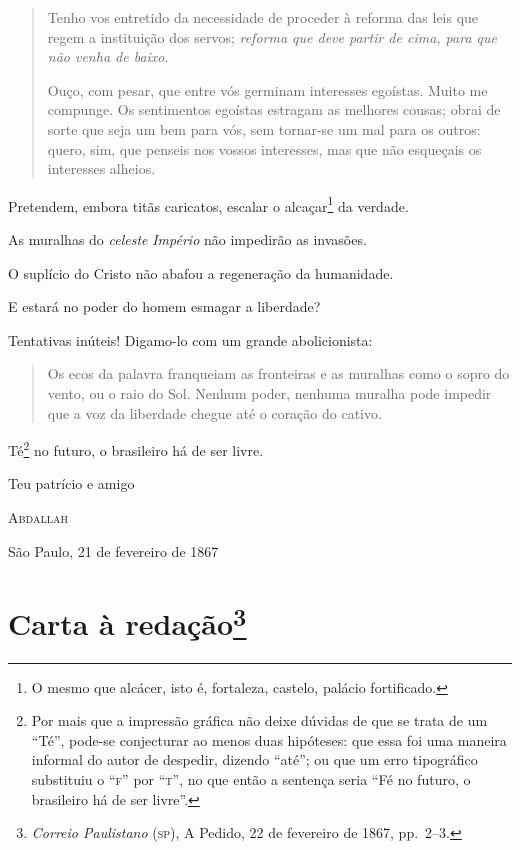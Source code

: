 \begin{quote}
Tenho vos entretido da necessidade de proceder à reforma das leis que
regem a instituição dos servos; \emph{reforma que deve partir de cima,
para que não venha de baixo}.

Ouço, com pesar, que entre vós germinam interesses egoístas. Muito me
compunge. Os sentimentos egoístas estragam as melhores cousas; obrai de
sorte que seja um bem para vós, sem tornar-se um mal para os outros:
quero, sim, que penseis nos vossos interesses, mas que não esqueçais os
interesses alheios.
\end{quote}

Pretendem, embora titãs caricatos, escalar o alcaçar\footnote{O mesmo
  que alcácer, isto é, fortaleza, castelo, palácio fortificado.} da
verdade.

As muralhas do \emph{celeste} \emph{Império} não impedirão as invasões.

O suplício do Cristo não abafou a regeneração da humanidade.

E estará no poder do homem esmagar a liberdade?

Tentativas inúteis! Digamo-lo com um grande abolicionista:

\begin{quote}
Os ecos da palavra franqueiam as fronteiras e as muralhas como o sopro
do vento, ou o raio do Sol. Nenhum poder, nenhuma muralha pode impedir
que a voz da liberdade chegue até o coração do cativo.
\end{quote}

Té\footnote{Por mais que a impressão gráfica não deixe dúvidas de que
  se trata de um ``Té'', pode-se conjecturar ao menos duas hipóteses: que
  essa foi uma maneira informal do autor de despedir, dizendo ``até''; ou
  que um erro tipográfico substituiu o ``\textsc{f}'' por ``\textsc{t}'', no que então a
  sentença seria ``Fé no futuro, o brasileiro há de ser livre''.} no
futuro, o brasileiro há de ser livre.

\begin{flushright}
Teu patrício e amigo

\textsc{Abdallah}

São Paulo, 21 de fevereiro de 1867
\end{flushright}

\chapter{Carta à redação\footnote{\emph{Correio Paulistano} (\textsc{sp}),
  A Pedido, 22 de fevereiro de 1867, pp.~2--3.}}

